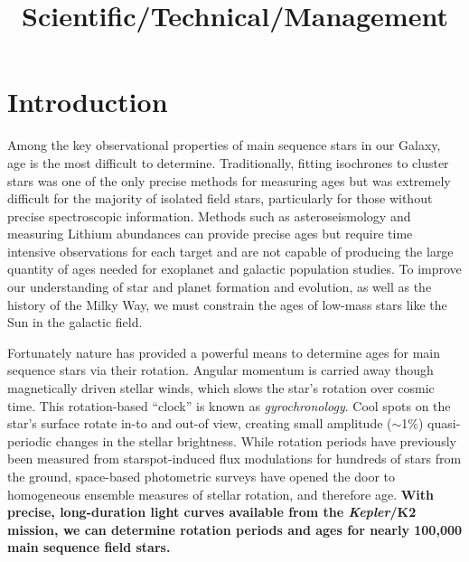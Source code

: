 \documentclass[12pt]{article}
\newcommand{\Kepler}{\textsl{Kepler}\xspace}
\begin{document}


\title{\vspace{-0.5in}Scientific/Technical/Management}
\date{}

\maketitle


\vspace{-1in}

\section{Introduction}



Among the key observational properties of main sequence stars in our Galaxy,
age is the most difficult to determine.
Traditionally, fitting isochrones to cluster stars was one of the only precise
methods for measuring ages but was extremely difficult for the majority of
isolated field stars, particularly for those without precise spectroscopic
information.
Methods such as asteroseismology and measuring Lithium abundances can provide
precise ages but require time intensive observations for each target and are
not capable of producing the large quantity of ages needed for exoplanet and
galactic population studies.
To improve our understanding of star and planet formation and evolution, as
well as the history of the Milky Way, we must constrain the ages of
low-mass stars like the Sun in the galactic field.

Fortunately nature has provided a powerful means to determine ages for main
sequence stars via their rotation.
Angular momentum is carried away though magnetically driven stellar winds,
which slows the star's rotation over cosmic time.
This rotation-based ``clock'' is known as {\it gyrochronology}.
Cool spots on the star's surface rotate in-to and out-of view, creating small
amplitude ($\sim$1\%) quasi-periodic changes in the stellar brightness.
While rotation periods have previously been %
measured from
starspot-induced flux modulations for hundreds of stars from the ground,
space-based photometric surveys have opened the door to homogeneous ensemble
measures of stellar rotation, and therefore age. 
{\bf With precise, long-duration light curves available from the \Kepler/K2
mission, we can determine rotation periods and ages for nearly 100,000
main sequence field stars.}
\end{document}
